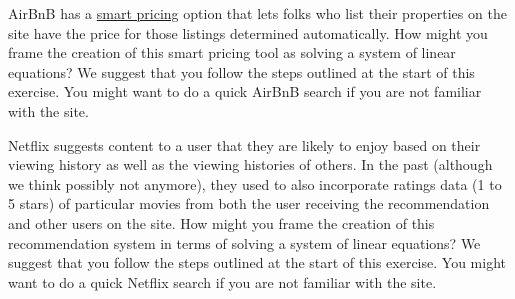 \begin{prob}
\be
\item AirBnB has a \href{https://www.airbnb.com/help/article/1168/how-do-i-turn-smart-pricing-on-or-off}{smart pricing} option that lets folks who list their properties on the site have the price for those listings determined automatically. How might you frame the creation of this smart pricing tool as solving a system of linear equations?  We suggest that you follow the steps outlined at the start of this exercise.  You might want to do a quick AirBnB search if you are not familiar with the site.
\item Netflix suggests content to a user that they are likely to enjoy based on their  viewing history as well as the viewing histories of others.  In the past (although we think possibly not anymore), they used to also incorporate ratings data (1 to 5 stars) of particular movies from both the user receiving the recommendation and other users on the site.  How might you frame the creation of this recommendation system in terms of solving a system of linear equations?  We suggest that you follow the steps outlined at the start of this exercise.  You might want to do a quick Netflix search if you are not familiar with the site.
\ee
\end{prob}

